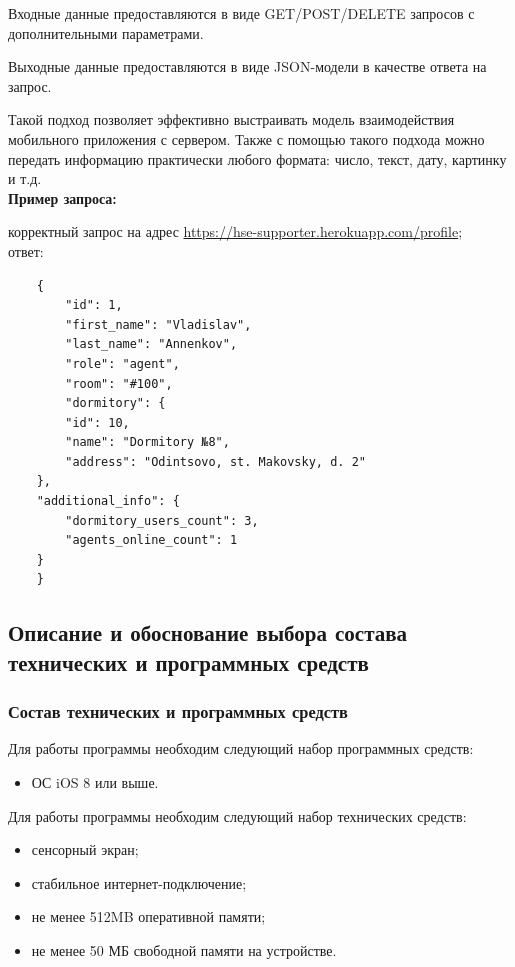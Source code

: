 \documentclass{../includes/TechDoc}
\begin{document}
    Входные данные предоставляются в виде GET/POST/DELETE запросов с дополнительными параметрами.

    Выходные данные предоставляются в виде JSON-модели в качестве ответа на запрос.

    Такой подход позволяет эффективно выстраивать модель взаимодействия мобильного приложения с сервером.
    Также с помощью такого подхода можно передать информацию практически любого формата: число, текст, дату, картинку и т.д.\\

    \noindent\textbf{Пример запроса:}

     корректный запрос на адрес \url{https://hse-supporter.herokuapp.com/profile};\\

     ответ:
    \begin{lstlisting}
    {
        "id": 1,
        "first_name": "Vladislav",
        "last_name": "Annenkov",
        "role": "agent",
        "room": "#100",
        "dormitory": {
        "id": 10,
        "name": "Dormitory №8",
        "address": "Odintsovo, st. Makovsky, d. 2"
    },
    "additional_info": {
        "dormitory_users_count": 3,
        "agents_online_count": 1
    }
    }
    \end{lstlisting}

    \clearpage

    \subsection{Описание и обоснование выбора состава технических и программных средств}

    \subsubsection{Состав технических и программных средств}

    Для работы программы необходим следующий набор программных средств:
    \begin{itemize}
        \item ОС iOS 8 или выше.
    \end{itemize}

    Для работы программы необходим следующий набор технических средств:
    \begin{itemize}
        \item сенсорный экран;
        \item стабильное интернет-подключение;
        \item не менее 512MB оперативной памяти;
        \item не менее 50 МБ свободной памяти на устройстве.
    \end{itemize}
\end{document}
